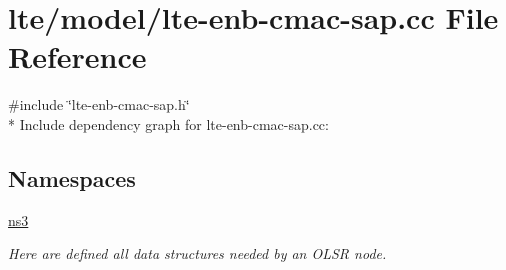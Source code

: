 \hypertarget{lte-enb-cmac-sap_8cc}{}\section{lte/model/lte-\/enb-\/cmac-\/sap.cc File Reference}
\label{lte-enb-cmac-sap_8cc}
{\ttfamily \#include \char`\"{}lte-\/enb-\/cmac-\/sap.\+h\char`\"{}}\\*
Include dependency graph for lte-\/enb-\/cmac-\/sap.cc\+:
\subsection*{Namespaces}
\begin{DoxyCompactItemize}
\item 
 \hyperlink{namespacens3}{ns3}
\begin{DoxyCompactList}\small\item\em Here are defined all data structures needed by an O\+L\+SR node. \end{DoxyCompactList}\end{DoxyCompactItemize}
